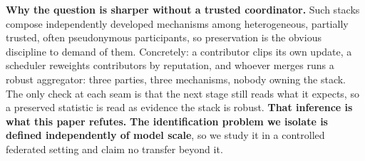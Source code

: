 \documentclass{article}
\begin{document}
\textbf{Why the question is sharper without a trusted coordinator.} Such stacks compose independently developed mechanisms among heterogeneous, partially trusted, often pseudonymous participants, so preservation is the obvious discipline to demand of them. Concretely: a contributor clips its own update, a scheduler reweights contributors by reputation, and whoever merges runs a robust aggregator: three parties, three mechanisms, nobody owning the stack. The only check at each seam is that the next stage still reads what it expects, so a preserved statistic is read as evidence the stack is robust. \textbf{That inference is what this paper refutes.} \textbf{The identification problem we isolate is defined independently of model scale}, so we study it in a controlled federated setting and claim no transfer beyond it.
\end{document}
